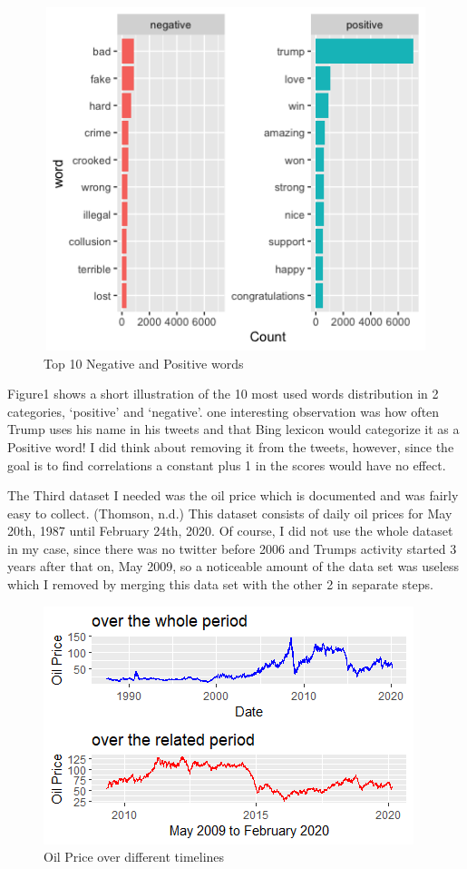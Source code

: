 \documentclass[]{article}
\begin{document}
\begin{figure}
\includegraphics[width=35cm,
  height=10cm,
  keepaspectratio]{Count}
\centering 
\caption{Top 10 Negative and Positive words}\label{Figure1}
\end{figure}

Figure1 shows a short illustration of the 10 most used words
distribution in 2 categories, `positive' and `negative'. one interesting
observation was how often Trump uses his name in his tweets and that
Bing lexicon would categorize it as a Positive word! I did think about
removing it from the tweets, however, since the goal is to find
correlations a constant plus 1 in the scores would have no effect.

The Third dataset I needed was the oil price which is documented and was
fairly easy to collect. (Thomson, n.d.) This dataset consists of daily
oil prices for May 20th, 1987 until February 24th, 2020. Of course, I
did not use the whole dataset in my case, since there was no twitter
before 2006 and Trumps activity started 3 years after that on, May 2009,
so a noticeable amount of the data set was useless which I removed by
merging this data set with the other 2 in separate steps.

\begin{figure}
\includegraphics{oilprice}
\centering 
\caption{Oil Price over different timelines}\label{Figure2}
\end{figure}
\end{document}
